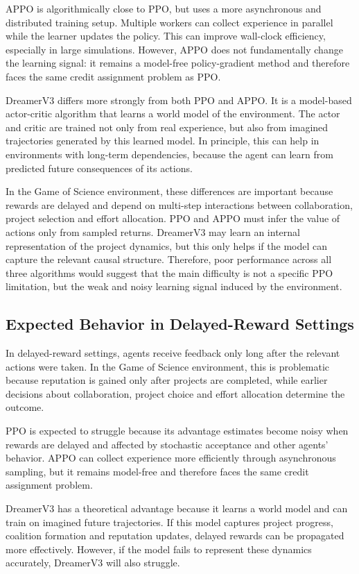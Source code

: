 \documentclass[english,bachelor]{hsluthesis}
\begin{document}
APPO is algorithmically close to PPO, but uses a more asynchronous and distributed training setup. Multiple workers can collect experience in parallel while the learner updates the policy. This can improve wall-clock efficiency, especially in large simulations. However, APPO does not fundamentally change the learning signal: it remains a model-free policy-gradient method and therefore faces the same credit assignment problem as PPO.

DreamerV3 differs more strongly from both PPO and APPO. It is a model-based actor-critic algorithm that learns a world model of the environment. The actor and critic are trained not only from real experience, but also from imagined trajectories generated by this learned model. In principle, this can help in environments with long-term dependencies, because the agent can learn from predicted future consequences of its actions.

In the Game of Science environment, these differences are important because rewards are delayed and depend on multi-step interactions between collaboration, project selection and effort allocation. PPO and APPO must infer the value of actions only from sampled returns. DreamerV3 may learn an internal representation of the project dynamics, but this only helps if the model can capture the relevant causal structure. Therefore, poor performance across all three algorithms would suggest that the main difficulty is not a specific PPO limitation, but the weak and noisy learning signal induced by the environment.

\subsection{Expected Behavior in Delayed-Reward Settings}

In delayed-reward settings, agents receive feedback only long after the relevant actions were taken. In the Game of Science environment, this is problematic because reputation is gained only after projects are completed, while earlier decisions about collaboration, project choice and effort allocation determine the outcome.

PPO is expected to struggle because its advantage estimates become noisy when rewards are delayed and affected by stochastic acceptance and other agents' behavior. APPO can collect experience more efficiently through asynchronous sampling, but it remains model-free and therefore faces the same credit assignment problem.

DreamerV3 has a theoretical advantage because it learns a world model and can train on imagined future trajectories. If this model captures project progress, coalition formation and reputation updates, delayed rewards can be propagated more effectively. However, if the model fails to represent these dynamics accurately, DreamerV3 will also struggle.
\end{document}
